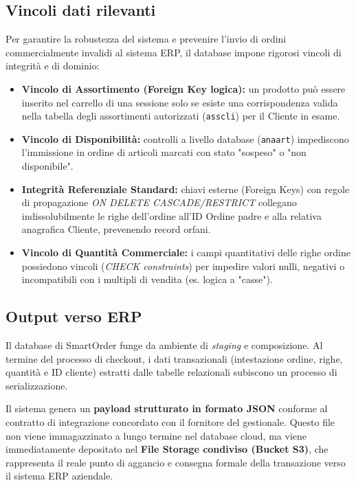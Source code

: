 \documentclass[a4paper, 11pt, oneside]{scrartcl}
\begin{document}
\subsection{Vincoli dati rilevanti}
Per garantire la robustezza del sistema e prevenire l'invio di ordini commercialmente invalidi al sistema ERP, il database impone rigorosi vincoli di integrità e di dominio:
\begin{itemize}
    \item \textbf{Vincolo di Assortimento (Foreign Key logica):} un prodotto può essere inserito nel carrello di una sessione solo se esiste una corrispondenza valida nella tabella degli assortimenti autorizzati (\texttt{asscli}) per il Cliente in esame.
    \item \textbf{Vincolo di Disponibilità:} controlli a livello database (\texttt{anaart}) impediscono l'immissione in ordine di articoli marcati con stato "sospeso" o "non disponibile".
    \item \textbf{Integrità Referenziale Standard:} chiavi esterne (Foreign Keys) con regole di propagazione \textit{ON DELETE CASCADE/RESTRICT} collegano indissolubilmente le righe dell'ordine all'ID Ordine padre e alla relativa anagrafica Cliente, prevenendo record orfani.
    \item \textbf{Vincolo di Quantità Commerciale:} i campi quantitativi delle righe ordine possiedono vincoli (\textit{CHECK constraints}) per impedire valori nulli, negativi o incompatibili con i multipli di vendita (es. logica a "casse").
\end{itemize}

\subsection{Output verso ERP}
Il database di SmartOrder funge da ambiente di \textit{staging} e composizione. Al termine del processo di checkout, i dati transazionali (intestazione ordine, righe, quantità e ID cliente) estratti dalle tabelle relazionali subiscono un processo di serializzazione. 

Il sistema genera un \textbf{payload strutturato in formato JSON} conforme al contratto di integrazione concordato con il fornitore del gestionale. Questo file non viene immagazzinato a lungo termine nel database cloud, ma viene immediatamente depositato nel \textbf{File Storage condiviso (Bucket S3)}, che rappresenta il reale punto di aggancio e consegna formale della transazione verso il sistema ERP aziendale.

\newpage
\end{document}
